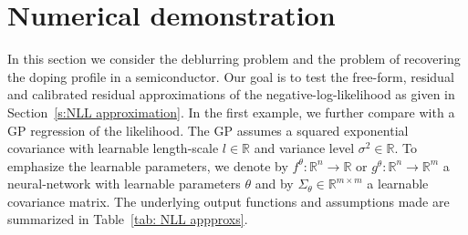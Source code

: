 \documentclass{amsart}
\theoremstyle{definition}
\newcommand{\R}{{\mathbb R}}
\newcommand{\norm}[1]{\left\|#1\right\|}
\begin{document}
\section{Numerical demonstration}\label{sec: numerics}
In this section we consider the deblurring problem and the problem of recovering the doping profile in a semiconductor. Our goal is to test the free-form, residual and calibrated residual approximations of the negative-log-likelihood as given in Section~\ref{s:NLL approximation}. In the first example, we further compare with  a GP regression of the likelihood. The GP assumes a squared exponential covariance with learnable length-scale $l\in \R$ and variance level $\sigma^2 \in \R$. To emphasize the learnable parameters, we denote by $f^\theta: \R^n\to \R$ or $g^\theta:\R^n \to \R^m$ a neural-network with learnable parameters $\theta$ and by $\Sigma_\theta \in \R^{m\times m}$ a learnable covariance matrix. The underlying output functions and assumptions made are summarized in Table~\ref{tab: NLL appproxs}. 
\end{document}
